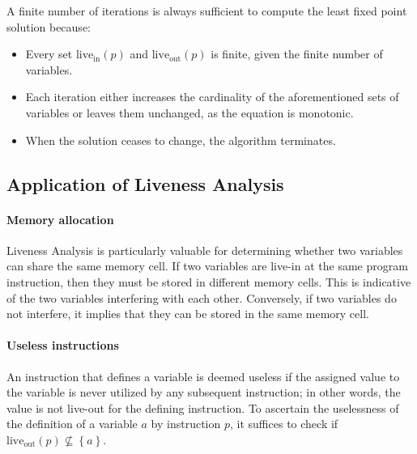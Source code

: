 A finite number of iterations is always sufficient to compute the least fixed point solution because:
\begin{itemize}
  \item Every set $\text{live}_\text{in}\left( p \right)$ and $\text{live}_\text{out}\left( p \right)$ is finite, given the finite number of variables.
  \item Each iteration either increases the cardinality of the aforementioned sets of variables or leaves them unchanged, as the equation is monotonic.
  \item When the solution ceases to change, the algorithm terminates.
\end{itemize}

\subsection{Application of Liveness Analysis}
\paragraph*{Memory allocation}
Liveness Analysis is particularly valuable for determining whether two variables can share the same memory cell. 
If two variables are live-in at the same program instruction, then they must be stored in different memory cells. 
This is indicative of the two variables interfering with each other. 
Conversely, if two variables do not interfere, it implies that they can be stored in the same memory cell.

\paragraph*{Useless instructions}
An instruction that defines a variable is deemed useless if the assigned value to the variable is never utilized by any subsequent instruction; in other words, the value is not live-out for the defining instruction. 
To ascertain the uselessness of the definition of a variable $a$ by instruction $p$, it suffices to check if $\text{live}_\text{out}\left( p \right) \not\subseteq \left\{ a \right\}$.

